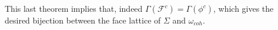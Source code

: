 \documentclass[10pt,a4paper]{article}
\DeclareMathOperator{\vol}{vol}
\def\defs{\stackrel{\tiny{\mbox{def}}}{=}}		%
\theoremstyle{plain}
\theoremstyle{remark}
\theoremstyle{definition}
\begin{document}
\begin{comment}
	
	With the previous inspiration, we will define our $c_0$ as:
	\begin{equation}
	c_0 \defs\frac1{\vol (Q)} \sum_{i=1}^{N_c} 
	\int_{Q_i}\frac1{d_{q+1}^i}\left(d_0^i - d^i_{[1:q]}\cdot x\right)\, \mathrm{d}x
	\end{equation}
	With this definition of $c_0$, we see that
	\begin{equation}\label{eqn:gamma2}
	c\cdot s = c\left( \frac1{\vol(Q)} \int_Q c\gamma(x)dx \right) =
	\frac1{ \vol(Q)}\sum_{i=1}^{N_c} \int_{Q_i} c\gamma(x)dx
	\end{equation}
	and using \cref{eqn:gammageq}\hspace{-1mm}
	\footnote{Which $s$ verifies as an equality.},
	we get that $c\cdot s = c_0$.
	
	We still have to check that $c\cdot s \geq c_0$ is a valid inequality.
	Indeed, given any section $\gamma^\prime$, 
	\cref{eqn:gammageq} is satisfied in each $Q_i$. 
	Since $Q_i$ form a subdivision of $Q$ and for all $i$,
	the inequalities have the same sign, 
	\cref{eqn:gamma2} together with \cref{eqn:gammageq} yields
	to $c\cdot s \geq c_0$.
	
	$\boxed{ \Rightarrow }$
	
	IN THE NEXT EPISODE
	\end{proof}
	This yields a bijection between the faces of $\Sigma(P,Q)$
	and the coherent subdivisions of $Q$, and thus in particular, 
	between the \emph{coarsest} such subdivisions and the facets of $\Sigma(P,Q)$.
	
	Equivalently, this yields a bijection between the face lattice of $\Sigma(P,Q)$
	and the poset $\omega_{coh}(P,Q)$.
	In particular, this implies that the dimension of $\Sigma(P,Q)$ is indeed $p-q$.
\end{comment}

This last theorem implies that, indeed $\Gamma(\mathcal{F}^c) = \Gamma(\phi^c)$,
which gives the desired bijection between the face lattice of $\Sigma$ and $\omega_{coh}$.




\end{document}
